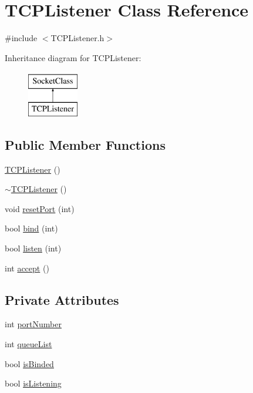 \hypertarget{classTCPListener}{\section{\-T\-C\-P\-Listener \-Class \-Reference}
\label{classTCPListener}
}


{\ttfamily \#include $<$\-T\-C\-P\-Listener.\-h$>$}

\-Inheritance diagram for \-T\-C\-P\-Listener\-:\begin{figure}[H]
\begin{center}
\leavevmode
\includegraphics[height=2.000000cm]{classTCPListener}
\end{center}
\end{figure}
\subsection*{\-Public \-Member \-Functions}
\begin{DoxyCompactItemize}
\item 
\hyperlink{classTCPListener_a58f2fc8c4992d63691cff12519279758}{\-T\-C\-P\-Listener} ()
\item 
\hyperlink{classTCPListener_af7e560c0c6c0ea486113dc6eabc4226d}{$\sim$\-T\-C\-P\-Listener} ()
\item 
void \hyperlink{classTCPListener_ab207b5227e906dd9a956cfd0243349b2}{reset\-Port} (int)
\item 
bool \hyperlink{classTCPListener_ae0b28ea37c99b35ae76e7eaee05aba87}{bind} (int)
\item 
bool \hyperlink{classTCPListener_a0dc5951a6f84afa2991d06b97114ba0e}{listen} (int)
\item 
int \hyperlink{classTCPListener_ab640f1bbae40d42f8838d64b7ac90e52}{accept} ()
\end{DoxyCompactItemize}
\subsection*{\-Private \-Attributes}
\begin{DoxyCompactItemize}
\item 
int \hyperlink{classTCPListener_adb28c377cc7edd8011e2171027ad163e}{port\-Number}
\item 
int \hyperlink{classTCPListener_ad8dcabf3ed2e479f8c518a5b31a9b143}{queue\-List}
\item 
bool \hyperlink{classTCPListener_ae2a201690fd3e302cf2a04be52617b48}{is\-Binded}
\item 
bool \hyperlink{classTCPListener_ab7f4c0050982e82238e463186abd683b}{is\-Listening}
\end{DoxyCompactItemize}


